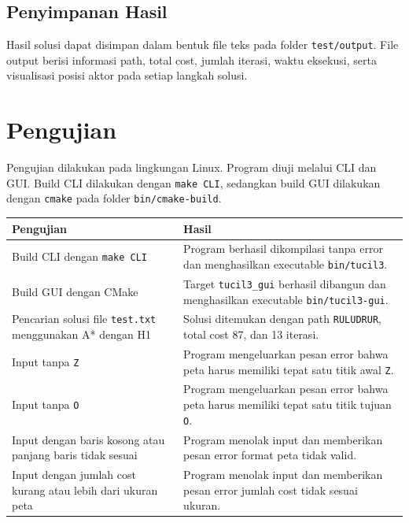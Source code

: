 \documentclass[a4paper,11pt]{article}
\begin{document}
\subsection{Penyimpanan Hasil}
Hasil solusi dapat disimpan dalam bentuk file teks pada folder \texttt{test/output}. File output berisi informasi path, total cost, jumlah iterasi, waktu eksekusi, serta visualisasi posisi aktor pada setiap langkah solusi.

\section{Pengujian}
Pengujian dilakukan pada lingkungan Linux. Program diuji melalui CLI dan GUI. Build CLI dilakukan dengan \texttt{make CLI}, sedangkan build GUI dilakukan dengan \texttt{cmake} pada folder \texttt{bin/cmake-build}.

\begin{longtable}{|p{5cm}|p{9cm}|}
    \hline
    \textbf{Pengujian} & \textbf{Hasil} \\
    \hline
    \endhead

    Build CLI dengan \texttt{make CLI}
    &
    Program berhasil dikompilasi tanpa error dan menghasilkan executable \texttt{bin/tucil3}. \\
    \hline

    Build GUI dengan CMake
    &
    Target \texttt{tucil3\_gui} berhasil dibangun dan menghasilkan executable \texttt{bin/tucil3-gui}. \\
    \hline

    Pencarian solusi file \texttt{test.txt} menggunakan A* dengan H1
    &
    Solusi ditemukan dengan path \texttt{RULUDRUR}, total cost 87, dan 13 iterasi. \\
    \hline

    Input tanpa \texttt{Z}
    &
    Program mengeluarkan pesan error bahwa peta harus memiliki tepat satu titik awal \texttt{Z}. \\
    \hline

    Input tanpa \texttt{O}
    &
    Program mengeluarkan pesan error bahwa peta harus memiliki tepat satu titik tujuan \texttt{O}. \\
    \hline

    Input dengan baris kosong atau panjang baris tidak sesuai
    &
    Program menolak input dan memberikan pesan error format peta tidak valid. \\
    \hline

    Input dengan jumlah cost kurang atau lebih dari ukuran peta
    &
    Program menolak input dan memberikan pesan error jumlah cost tidak sesuai ukuran. \\
    \hline
\end{longtable}
\end{document}

